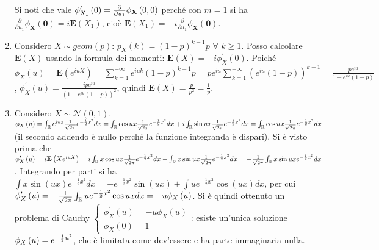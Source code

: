 \documentclass{article}
\begin{document}
\begin{enumerate}
Si noti che vale $\phi _{X_{1}}^{\prime }\left( 0\right) =\frac{\partial }{%
\partial u_{1}}\phi _{\mathbf{X}}\left( 0,0\right) $ perch\'{e} con $m=1$ si
ha $\frac{\partial }{\partial u_{1}}\phi _{\mathbf{X}}\left( \mathbf{0}%
\right) =i\mathbf{E}\left( X_{1}\right) $, cio\`{e} $\mathbf{E}\left(
X_{1}\right) =-i\frac{\partial }{\partial u_{1}}\phi _{\mathbf{X}}\left( 
\mathbf{0}\right) $.

\item Considero $X\sim geom\left( p\right) $: $p_{X}\left( k\right) =\left(
1-p\right) ^{k-1}p$ $\forall $ $k\geq 1$. Posso calcolare $\mathbf{E}\left(
X\right) $ usando la formula dei momenti: $\mathbf{E}\left( X\right) =-i\phi
_{X}^{\prime }\left( 0\right) $. Poich\'{e} $\phi _{X}\left( u\right) =%
\mathbf{E}\left( e^{iuX}\right) =\sum_{k=1}^{+\infty }e^{iuk}\left(
1-p\right) ^{k-1}p=pe^{iu}\sum_{k=1}^{+\infty }\left( e^{iu}\left(
1-p\right) \right) ^{k-1}=\frac{pe^{iu}}{1-e^{iu}\left( 1-p\right) }$, $\phi
_{X}^{\prime }\left( u\right) =\frac{ipe^{iu}}{\left( 1-e^{iu}\left(
1-p\right) \right) ^{2}}$, quindi $\mathbf{E}\left( X\right) =\frac{p}{p^{2}}%
=\frac{1}{p}$.

\item Considero $X\sim \mathcal{N}\left( 0,1\right) $. $\phi _{X}\left(
u\right) =\int_{%
\mathbb{R}
}e^{iux}\frac{1}{\sqrt{2\pi }}e^{-\frac{1}{2}x^{2}}dx=\int_{%
\mathbb{R}
}\cos ux\frac{1}{\sqrt{2\pi }}e^{-\frac{1}{2}x^{2}}dx+i\int_{%
\mathbb{R}
}\sin ux\frac{1}{\sqrt{2\pi }}e^{-\frac{1}{2}x^{2}}dx=\int_{%
\mathbb{R}
}\cos ux\frac{1}{\sqrt{2\pi }}e^{-\frac{1}{2}x^{2}}dx$ (il secondo addendo 
\`{e} nullo perch\'{e} la funzione integranda \`{e} dispari). Si \`{e} visto
prima che $\phi _{X}^{\prime }\left( u\right) =i\mathbf{E}\left(
Xe^{iuX}\right) =i\int_{%
\mathbb{R}
}x\cos ux\frac{1}{\sqrt{2\pi }}e^{-\frac{1}{2}x^{2}}dx-\int_{%
\mathbb{R}
}x\sin ux\frac{1}{\sqrt{2\pi }}e^{-\frac{1}{2}x^{2}}dx=-\frac{1}{\sqrt{2\pi }%
}\int_{%
\mathbb{R}
}x\sin uxe^{-\frac{1}{2}x^{2}}dx$. Integrando per parti si ha $\int x\sin
\left( ux\right) e^{-\frac{1}{2}x^{2}}dx=-e^{-\frac{1}{2}x^{2}}\sin \left(
ux\right) +\int ue^{-\frac{1}{2}x^{2}}\cos \left( ux\right) dx$, per cui $%
\phi _{X}^{\prime }\left( u\right) =-\frac{1}{\sqrt{2\pi }}\int_{%
\mathbb{R}
}ue^{-\frac{1}{2}x^{2}}\cos uxdx=-u\phi _{X}\left( u\right) $. Si \`{e}
quindi ottenuto un problema di Cauchy $\left\{ 
\begin{array}{c}
\phi _{X}^{\prime }\left( u\right) =-u\phi _{X}\left( u\right) \\ 
\phi _{X}\left( 0\right) =1%
\end{array}%
\right. $: esiste un'unica soluzione $\phi _{X}\left( u\right) =e^{-\frac{1}{%
2}u^{2}}$, che \`{e} limitata come dev'essere e ha parte immaginaria nulla.


\end{enumerate}
\end{document}

